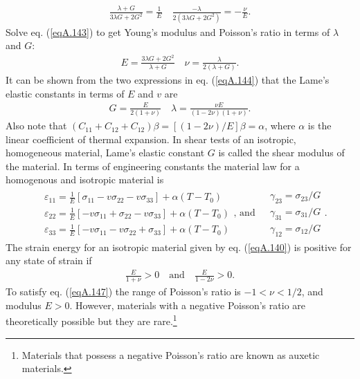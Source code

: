 \documentclass{AeroStructure-ERJohnson}
\begin{document}
\begin{align}\label{eqA.143}
\frac{\lambda+G}{3 \lambda G+2 G^{2}}=\frac{1}{E} \quad \frac{-\lambda}{2\left(3 \lambda G+2 G^{2}\right)}=-\frac{\nu}{E}.
\end{align}
Solve eq. (\ref{eqA.143}) to get Young’s modulus and Poisson’s ratio in terms of $\lambda$ and $G$:
\begin{align}\label{eqA.144}
E=\frac{3 \lambda G+2 G^{2}}{\lambda+G} \quad \nu=\frac{\lambda}{2(\lambda+G)}.
\end{align}
It can be shown from the two expressions in eq. (\ref{eqA.144}) that the Lame’s elastic constants in terms of $E$ and $v$ are
\begin{align}\label{eqA.145}
G=\frac{E}{2(1+\nu)} \quad \lambda=\frac{\nu E}{(1-2 \nu)(1+\nu)}.
\end{align}
Also note that $(C_{11}+C_{12}+C_{12}) \beta=[(1-2 \nu) / E] \beta=\alpha$, where $\alpha$ is the linear coefficient of thermal expansion. In shear tests of an isotropic, homogeneous material, Lame’s elastic constant $G$ is called the shear modulus of the material. In terms of engineering constants the material law for a homogenous and isotropic material is
\begin{align}\label{eqA.146}
\begin{aligned}
&\varepsilon_{11}=\frac{1}{E}[\sigma_{11}-v \sigma_{22}-v \sigma_{33}]+\alpha(T-T_{0}) \\
&\varepsilon_{22}=\frac{1}{E}[-v \sigma_{11}+\sigma_{22}-v \sigma_{33}]+\alpha(T-T_{0}) \\
&\varepsilon_{33}=\frac{1}{E}[-v \sigma_{11}-v \sigma_{22}+\sigma_{33}]+\alpha(T-T_{0})
\end{aligned}\mbox{, and }
\begin{aligned}
&\gamma_{23}=\sigma_{23} / G \\
&\gamma_{31}=\sigma_{31} / G \\
&\gamma_{12}=\sigma_{12} / G
\end{aligned}.
\end{align}
The strain energy\enlargethispage{-1\baselineskip} for an isotropic material given by eq. (\ref{eqA.140}) is positive for any state of strain if
\begin{align}\label{eqA.147}
\frac{E}{1+\nu}>0 \quad \text{and} \quad \frac{E}{1-2 \nu}>0.
\end{align}
To satisfy eq. (\ref{eqA.147}) the range of Poisson’s ratio is $-1<\nu<1 / 2$, and modulus $E>0$. However, materials with a negative Poisson’s ratio are theoretically possible but they are rare.\footnote{Materials that possess a negative Poisson's ratio are known as auxetic materials.}
\end{document}
